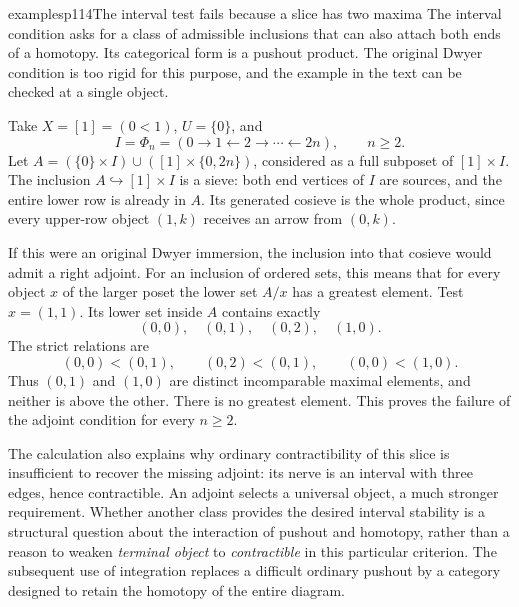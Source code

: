 \begin{dcomment}{examples}{p114}{The interval test fails because a slice has two maxima}
The interval condition asks for a class of admissible inclusions that can also attach both ends of a homotopy. Its categorical form is a pushout product. The original Dwyer condition is too rigid for this purpose, and the example in the text can be checked at a single object.

Take $X=[1]=(0<1)$, $U=\{0\}$, and
\[
 I=\Phi_n=(0\to1\leftarrow2\to\cdots\leftarrow2n),
 \qquad n\geq2.
\]
Let $A=(\{0\}\times I)\cup([1]\times\{0,2n\})$, considered as a full subposet of $[1]\times I$. The inclusion $A\hookrightarrow[1]\times I$ is a sieve: both end vertices of $I$ are sources, and the entire lower row is already in $A$. Its generated cosieve is the whole product, since every upper-row object $(1,k)$ receives an arrow from $(0,k)$.

If this were an original Dwyer immersion, the inclusion into that cosieve would admit a right adjoint. For an inclusion of ordered sets, this means that for every object $x$ of the larger poset the lower set $A/x$ has a greatest element. Test $x=(1,1)$. Its lower set inside $A$ contains exactly
\[
 (0,0),\quad(0,1),\quad(0,2),\quad(1,0).
\]
The strict relations are
\[
 (0,0)<(0,1),\qquad
 (0,2)<(0,1),\qquad
 (0,0)<(1,0).
\]
Thus $(0,1)$ and $(1,0)$ are distinct incomparable maximal elements, and neither is above the other. There is no greatest element. This proves the failure of the adjoint condition for every $n\geq2$.

The calculation also explains why ordinary contractibility of this slice is insufficient to recover the missing adjoint: its nerve is an interval with three edges, hence contractible. An adjoint selects a universal object, a much stronger requirement. Whether another class provides the desired interval stability is a structural question about the interaction of pushout and homotopy, rather than a reason to weaken \emph{terminal object} to \emph{contractible} in this particular criterion. The subsequent use of integration replaces a difficult ordinary pushout by a category designed to retain the homotopy of the entire diagram.
\end{dcomment}

